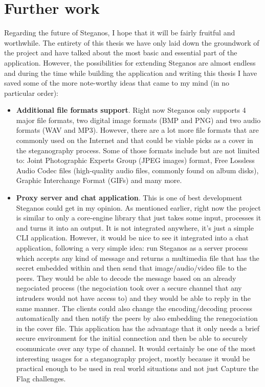 \section{Further work}
Regarding the future of Steganos, I hope that it will be fairly fruitful and worthwhile. The entirety of this thesis we have only laid down the groundwork of the project and have talked about the most basic and essential part of the application. However, the possibilities for extending Steganos are almost endless and during the time while building the application and writing this thesis I have saved some of the more note-worthy ideas that came to my mind (in no particular order):
\begin{itemize}
	\item \textbf{Additional file formats support}. Right now Steganos only supports 4 major file formats, two digital image formats (BMP and PNG) and two audio formats (WAV and MP3). However, there are a lot more file formats that are commonly used on the Internet and that could be viable picks as a cover in the steganography process. Some of those formats include but are not limited to: Joint Photographic Experts Group (JPEG images) format, Free Lossless Audio Codec files (high-quality audio files, commonly found on album disks), Graphic Interchange Format (GIFs) and many more. 
	\item \textbf{Proxy server and chat application}. This is one of best development Steganos could get in my opinion. As mentioned earlier, right now the project is similar to only a core-engine library that just takes some input, processes it and turns it into an output. It is not integrated anywhere, it's just a simple CLI application. However, it would be nice to see it integrated into a chat application, following a very simple idea: run Steganos as a server process which accepts any kind of message and returns a multimedia file that has the secret embedded within and then send that image/audio/video file to the peers. They would be able to decode the message based on an already negociated process (the negociation took over a secure channel that any intruders would not have access to) and they would be able to reply in the same manner. The clients could also change the encoding/decoding process automatically and then notify the peers by also embedding the renegociation in the cover file. This application has the advantage that it only needs a brief secure environment for the initial connection and then be able to securely coomunicate over any type of channel. It would certainly be one of the most interesting usages for a steganography project, mostly because it would be practical enough to be used in real world situations and not just Capture the Flag challenges.

\end{itemize}
